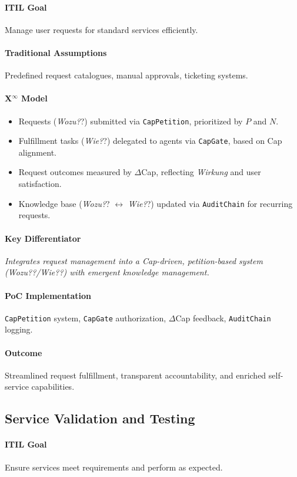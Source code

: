 \documentclass[12pt, a4paper]{scrartcl}
\newcommand{\Xinf}{X$^\infty$}                        %
\newcommand{\DeltaCap}{$\Delta$Cap}                    %
\newcommand{\Wirkung}{\textit{Wirkung}}                 %
\newcommand{\CapGate}{\texttt{CapGate}}
\newcommand{\AuditChain}{\texttt{AuditChain}}
\newcommand{\CapPetition}{\texttt{CapPetition}}        %
\newcommand{\Wozu}{\textit{Wozu?}}                      %
\newcommand{\Wie}{\textit{Wie?}}                        %
\begin{document}
\paragraph{ITIL Goal} Manage user requests for standard services efficiently.
\paragraph{Traditional Assumptions} Predefined request catalogues, manual approvals, ticketing systems.
\paragraph*{\Xinf{} Model}
\begin{itemize}
    \item Requests (\Wozu?) submitted via \CapPetition{}, prioritized by $P$ and $N$.
    \item Fulfillment tasks (\Wie?) delegated to agents via \CapGate{}, based on Cap alignment.
    \item Request outcomes measured by \DeltaCap{}, reflecting \Wirkung{} and user satisfaction.
    \item Knowledge base (\Wozu? $\leftrightarrow$ \Wie?) updated via \AuditChain{} for recurring requests. %
\end{itemize}
\paragraph{Key Differentiator} \textit{Integrates request management into a Cap-driven, petition-based system (\Wozu?/\Wie?) with emergent knowledge management.}
\paragraph{PoC Implementation} \CapPetition{} system, \CapGate{} authorization, \DeltaCap{} feedback, \AuditChain{} logging.
\paragraph{Outcome} Streamlined request fulfillment, transparent accountability, and enriched self-service capabilities.

\subsection{Service Validation and Testing} %
\paragraph{ITIL Goal} Ensure services meet requirements and perform as expected.
\end{document}
